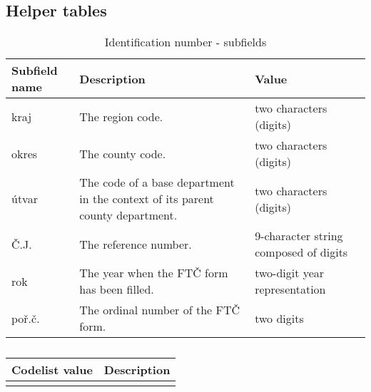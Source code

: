 \subsection{Helper tables}
\begin{table}[!hbtp]
\begin{tabular}{|l|p{4cm}|p{4cm}|}
\hline
\textbf{Subfield name} & \textbf{Description} & \textbf{Value} \\
\hline
kraj & The region code. & two characters (digits) \\
\hline
okres & The county code. & two characters (digits) \\
\hline
útvar & The code of a base department in the context of its parent county department. & two characters (digits) \\
\hline
Č.J. & The reference number. & 9-character string composed of digits \\
\hline
rok & The year when the FTČ form has been filled. & two-digit year representation \\
\hline
poř.č. & The ordinal number of the FTČ form. & two digits \\
\hline
\end{tabular}
\caption{Identification number - subfields}
\label{table:identification_number_subfields}
\end{table}

\begin{table}[!hbtp]
\begin{tabular}{|c|c|}
\hline
\textbf{Codelist value}&\textbf{Description} \\
\hline
& \\
\hline
\hline
\end{tabular}
\caption{}
\label{a}
\end{table}